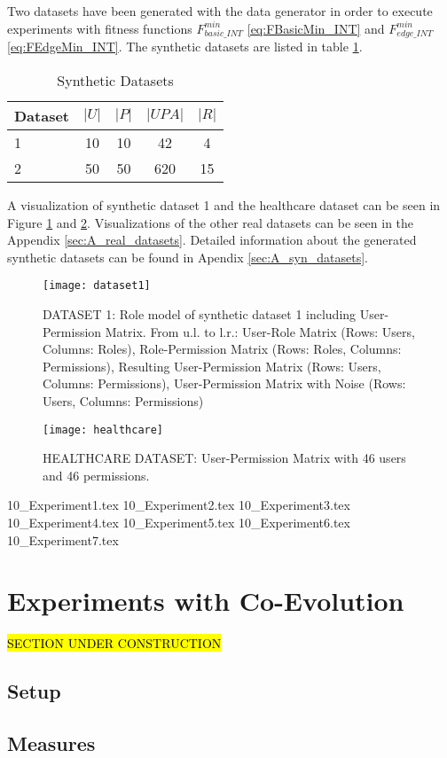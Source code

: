 Two datasets have been generated with the data generator in order to execute experiments with fitness functions $F_{basic\_INT}^{min}$ \eqref{eq:FBasicMin_INT} and $F_{edge\_INT}^{min}$ \eqref{eq:FEdgeMin_INT}. The synthetic datasets are listed in table \ref{tab:syntheticDatasets}.

\begin{table}[H]
    \centering
    \begin{tabular}{|l|c|c|c|c|}
        \hline
        \rowcolor{myGray} 
        \textbf{Dataset} & \textbf{$|U|$} & \textbf{$|P|$} & \textbf{$|UPA|$} & \textbf{$|R|$}\\ \hline
        1       & 10    & 10   & 42    & 4\\ \hline
        2       & 50    & 50   & 620   & 15\\ \hline
    \end{tabular}
    \caption{Synthetic Datasets}
    \label{tab:syntheticDatasets}
\end{table}

A visualization of synthetic dataset 1 and the healthcare dataset can be seen in Figure \ref{fig:dataset1} and \ref{fig:healthcare}. Visualizations of the other real datasets can be seen in the Appendix \ref{sec:A_real_datasets}. Detailed information about the generated synthetic datasets can be found in Apendix \ref{sec:A_syn_datasets}.

\begin{figure}[H]
    \centering
    \texttt{[image: dataset1]}
    \caption{DATASET 1: Role model of synthetic dataset 1 including User-Permission Matrix. From u.l. to l.r.: User-Role Matrix (Rows: Users, Columns: Roles), Role-Permission Matrix (Rows: Roles, Columns: Permissions), Resulting User-Permission Matrix (Rows: Users, Columns: Permissions), User-Permission Matrix with Noise (Rows: Users, Columns: Permissions)}
    \label{fig:dataset1}
\end{figure}

\begin{figure}[H]
    \centering
    \texttt{[image: healthcare]}
    \caption{HEALTHCARE DATASET: User-Permission Matrix with 46 users and 46 permissions.}
    \label{fig:healthcare}
\end{figure}

{10_Experiment1.tex}
{10_Experiment2.tex}
{10_Experiment3.tex}
{10_Experiment4.tex}
{10_Experiment5.tex}
{10_Experiment6.tex}
{10_Experiment7.tex}

\section{Experiments with Co-Evolution}
\hl{SECTION UNDER CONSTRUCTION}\\
\subsection{Setup}
\subsection{Measures}
